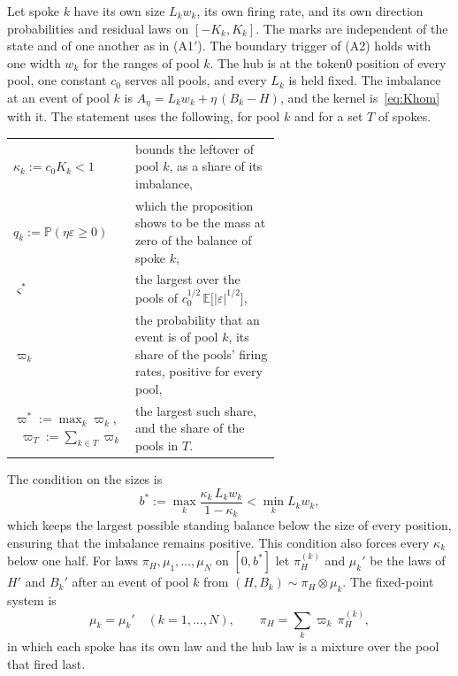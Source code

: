 \documentclass[11pt,a4paper]{article}
\theoremstyle{siphon}
\begin{document}
Let spoke $k$ have its own size $L_k w_k$, its own firing rate, and its own direction probabilities and residual laws on $[-K_k, K_k]$. The marks are independent of the state and of one another as in (A1$'$). The boundary trigger of (A2) holds with one width $w_k$ for the ranges of pool $k$. The hub is at the token0 position of every pool, one constant $c_0$ serves all pools, and every $L_k$ is held fixed. The imbalance at an event of pool $k$ is $A_\eta = L_k w_k + \eta\,(B_k - H)$, and the kernel is~\eqref{eq:Khom} with it. The statement uses the following, for pool $k$ and for a set $T$ of spokes.
\begin{center}
\begin{tabular}{@{}l@{\qquad}p{0.6\linewidth}@{}}
$\kappa_k := c_0 K_k < 1$ & bounds the leftover of pool $k$, as a share of its imbalance, \\[2pt]
$q_k := \mathbb{P}(\eta \varepsilon \geq 0)$ & which the proposition shows to be the mass at zero of the balance of spoke $k$, \\[2pt]
$\varsigma^*$ & the largest over the pools of $c_0^{1/2}\,\mathbb{E}\bigl[|\varepsilon|^{1/2}\bigr]$, \\[2pt]
$\varpi_k$ & the probability that an event is of pool $k$, its share of the pools' firing rates, positive for every pool, \\[2pt]
$\varpi^* := \max_k \varpi_k$, \ $\varpi_T := \sum_{k \in T} \varpi_k$ & the largest such share, and the share of the pools in $T$.
\end{tabular}
\end{center}
The condition on the sizes is
\begin{equation}\label{eq:heterobox}
b^*  :=  \max_k \frac{\kappa_k\,L_k w_k}{1 - \kappa_k}  <  \min_k L_k w_k ,
\end{equation}
which keeps the largest possible standing balance below the size of every position, ensuring that the imbalance remains positive. This condition also forces every $\kappa_k$ below one half. For laws $\pi_H, \mu_1, \ldots, \mu_N$ on $[0, b^*]$ let $\pi_H^{(k)}$ and $\mu_k'$ be the laws of $H'$ and $B_k'$ after an event of pool $k$ from $(H, B_k) \sim \pi_H \otimes \mu_k$. The fixed-point system is
\begin{equation}\label{eq:McKVhetero}
\mu_k  =  \mu_k' \quad (k = 1, \ldots, N), \qquad \pi_H  =  \sum_{k} \varpi_k\,\pi_H^{(k)} ,
\end{equation}
in which each spoke has its own law and the hub law is a mixture over the pool that fired last.
\end{document}
